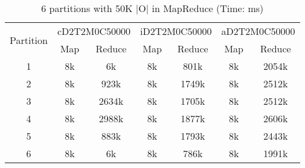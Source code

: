\begin{table*}[t]
  \centering
\makeatletter
    \long{}
\makeatother
  \caption{6 partitions with 50K |O| in MapReduce (Time: ms)}
    \vspace*{3pt}
  \footnotesize

  \label{table:partition6}
  \begin{tabular}{|c||c|c|c|c|c|c|}
  \hline
  \multirow{2}{*}{Partition} &  \multicolumn{2}{|c|}{cD2T2M0C50000} & \multicolumn{2}{|c|}{iD2T2M0C50000} &\multicolumn{2}{|c|}{aD2T2M0C50000} \\\cline{2-7}
    &  Map & Reduce & Map & Reduce & Map & Reduce \\\hline\hline


\cline{2-7}
    1 &  8k & 6k & 8k & 801k & 8k & 2054k \\\hline

\cline{2-7}
    2 &  8k & 923k & 8k & 1749k & 8k & 2512k \\\hline

\cline{2-7}
    3 &  8k & 2634k & 8k & 1705k & 8k & 2512k  \\\hline

\cline{2-7}
    4 &  8k & 2988k & 8k & 1877k & 8k & 2606k  \\\hline

\cline{2-7}
    5 &  8k & 883k & 8k & 1793k & 8k & 2443k  \\\hline

\cline{2-7}
    6 &  8k & 6k & 8k & 786k & 8k & 1991k  \\\hline

  \end{tabular}
  \vspace*{-17pt}
\end{table*}
